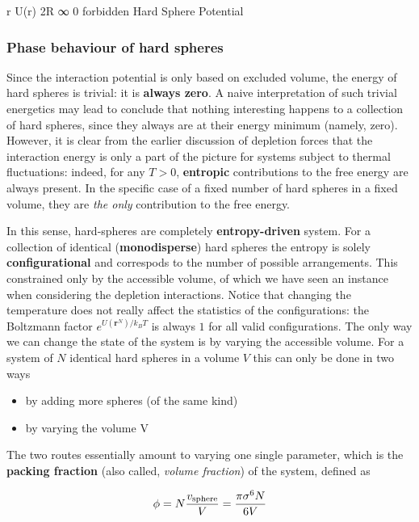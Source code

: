 \documentclass[
  letterpaper,
  enabledeprecatedfontcommands]{report}
\providecommand{\tightlist}{%
  \setlength{\itemsep}{0pt}\setlength{\parskip}{0pt}}
\begin{document}
r U(r) 2R ∞ 0 forbidden Hard Sphere Potential

\subsubsection*{Phase behaviour of hard
spheres}\label{phase-behaviour-of-hard-spheres}

Since the interaction potential is only based on excluded volume, the
energy of hard spheres is trivial: it is \textbf{always zero}. A naive
interpretation of such trivial energetics may lead to conclude that
nothing interesting happens to a collection of hard spheres, since they
always are at their energy minimum (namely, zero). However, it is clear
from the earlier discussion of depletion forces that the interaction
energy is only a part of the picture for systems subject to thermal
fluctuations: indeed, for any \(T>0\), \textbf{entropic} contributions
to the free energy are always present. In the specific case of a fixed
number of hard spheres in a fixed volume, they are \emph{the only}
contribution to the free energy.

In this sense, hard-spheres are completely \textbf{entropy-driven}
system. For a collection of identical (\textbf{monodisperse}) hard
spheres the entropy is solely \textbf{configurational} and correspods to
the number of possible arrangements. This constrained only by the
accessible volume, of which we have seen an instance when considering
the depletion interactions. Notice that changing the temperature does
not really affect the statistics of the configurations: the Boltzmann
factor \(e^{U(\mathbf{r}^N)/k_BT}\) is always \(1\) for all valid
configurations. The only way we can change the state of the system is by
varying the accessible volume. For a system of \(N\) identical hard
spheres in a volume \(V\) this can only be done in two ways

\begin{itemize}
\tightlist
\item
  by adding more spheres (of the same kind)
\item
  by varying the volume V
\end{itemize}

The two routes essentially amount to varying one single parameter, which
is the \textbf{packing fraction} (also called, \emph{volume fraction})
of the system, defined as

\[\phi = N\dfrac{v_{\rm sphere}}{V} = \dfrac{\pi \sigma^6 N}{6V}\]
\end{document}
